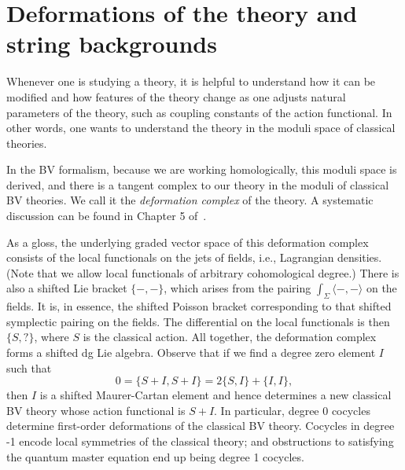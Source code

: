 \section{Deformations of the theory and string backgrounds}
\label{sec: moduli}




Whenever one is studying a theory,
it is helpful to understand how it can be modified 
and how features of the theory change as one adjusts natural parameters of the theory,
such as coupling constants of the action functional.
In other words, one wants to understand the theory in the moduli space of classical theories.

In the BV formalism, because we are working homologically, this moduli space is derived,
and there is a tangent complex to our theory in the moduli of classical BV theories.
We call it the {\em deformation complex} of the theory.
A systematic discussion can be found in Chapter 5 of~\cite{CosBook}.

As a gloss, the underlying graded vector space of this deformation complex consists of the local functionals on the jets of fields, i.e., Lagrangian densities.
(Note that we allow local functionals of arbitrary cohomological degree.) 
There is also a shifted Lie bracket $\{-,-\}$, 
which arises from the pairing $\int_\Sigma \langle-,-\rangle$ on the fields.
It is, in essence, the shifted Poisson bracket corresponding to that shifted symplectic pairing on the fields.
The differential on the local functionals is then $\{S,?\}$, where $S$ is the classical action. 
All together, the deformation complex forms a shifted dg Lie algebra. 
Observe that if we find a degree zero element $I$ such that
\[
0=\{S +I,S +I\}=2\{S,I\}+\{I,I\},
\]
then $I$ is a shifted Maurer-Cartan element and 
hence determines a new classical BV theory whose action functional is $S + I$. 
In particular, degree 0 cocycles determine first-order deformations of the classical BV theory. Cocycles in degree -1 encode local symmetries of the classical theory; 
and obstructions to satisfying the quantum master equation end up being degree 1 cocycles.

